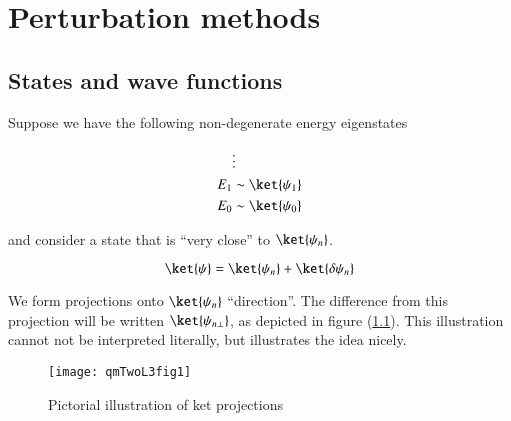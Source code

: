 %
%

\chapter{Perturbation methods}
\label{chap:qmTwoL3}
{}
\date{Sept 19, 2011}

\beginArtWithToc

%

\section{States and wave functions}

Suppose we have the following non-degenerate energy eigenstates

\begin{align*}
&\vdots \\
E_1 &\sim \ket{\psi_1} \\
E_0 &\sim \ket{\psi_0}
\end{align*}

and consider a state that is ``very close'' to $\ket{\psi_n}$.

\begin{equation}\label{eqn:qmTwoL3:10}
\ket{\psi} = \ket{\psi_n} + \ket{\delta \psi_n}
\end{equation}

We form projections onto $\ket{\psi_n}$ ``direction''.  The difference from this projection will be written $\ket{\psi_{n \perp}}$, as depicted in figure (\ref{fig:qmTwoL3:1}).  This illustration cannot not be interpreted literally, but illustrates the idea nicely.

\begin{figure}[htp]
\centering
\texttt{[image: qmTwoL3fig1]}
\caption{Pictorial illustration of ket projections}\label{fig:qmTwoL3:1}
\end{figure}

